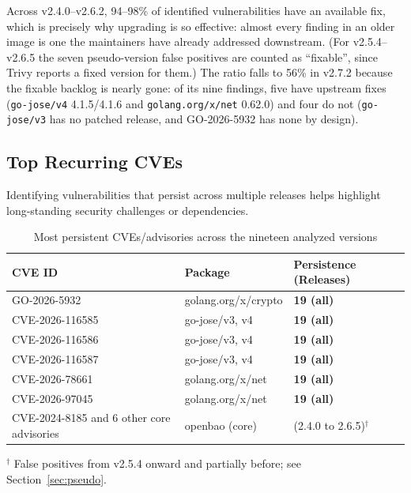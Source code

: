\documentclass{article}
\begin{document}
Across v2.4.0--v2.6.2, 94--98\% of identified vulnerabilities have an available fix, which is precisely why upgrading is so effective: almost every finding in an older image is one the maintainers have already addressed downstream. (For v2.5.4--v2.6.5 the seven pseudo-version false positives are counted as ``fixable'', since Trivy reports a fixed version for them.) The ratio falls to 56\% in v2.7.2 because the fixable backlog is nearly gone: of its nine findings, five have upstream fixes (\texttt{go-jose/v4} 4.1.5/4.1.6 and \texttt{golang.org/x/net} 0.62.0) and four do not (\texttt{go-jose/v3} has no patched release, and GO-2026-5932 has none by design).

\subsection{Top Recurring CVEs}
Identifying vulnerabilities that persist across multiple releases helps highlight long-standing security challenges or dependencies.

\begin{table}[H]
    \centering
    \caption{Most persistent CVEs/advisories across the nineteen analyzed versions}
    \label{tab:recurring_cves}
    \begin{tabularx}{\textwidth}{l l >{\centering\arraybackslash}X}
        \toprule
        \textbf{CVE ID} & \textbf{Package} & \textbf{Persistence (Releases)} \\
        \midrule
        GO-2026-5932    & golang.org/x/crypto   & \textbf{19 (all)} \\
        CVE-2026-116585 & go-jose/v3, v4        & \textbf{19 (all)} \\
        CVE-2026-116586 & go-jose/v3, v4        & \textbf{19 (all)} \\
        CVE-2026-116587 & go-jose/v3, v4        & \textbf{19 (all)} \\
        CVE-2026-78661  & golang.org/x/net      & \textbf{19 (all)} \\
        CVE-2026-97045  & golang.org/x/net      & \textbf{19 (all)} \\
        \midrule
        CVE-2024-8185 and 6 other core advisories & openbao (core) & 16 (2.4.0 to 2.6.5)$^{\dagger}$ \\
        \bottomrule
    \end{tabularx}
\end{table}
{\footnotesize $^{\dagger}$ False positives from v2.5.4 onward and partially before; see Section~\ref{sec:pseudo}.}
\end{document}
